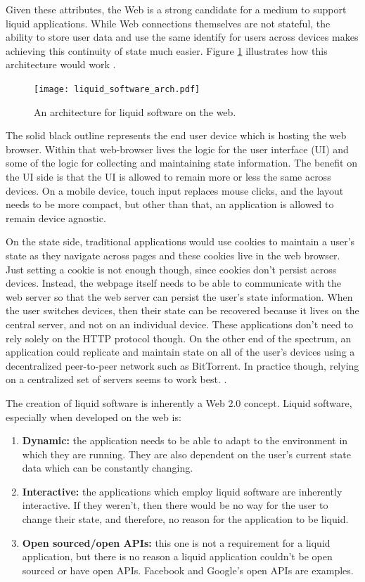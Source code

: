 \documentclass[12pt]{article}
\begin{document}
Given these attributes, the Web is a strong candidate for a medium to support liquid applications.  While Web connections themselves are not stateful, the ability to store user data and use the same identify for users across devices makes achieving this continuity of state much easier.  Figure \ref{fig:liquid_web_arch} illustrates how this architecture would work \cite{liquid_web}.

\begin{figure}[H]
  \begin{center}
    \texttt{[image: liquid\_software\_arch.pdf]}
    \caption{An architecture for liquid software on the web.}
    \label{fig:liquid_web_arch}
  \end{center}
\end{figure}

The solid black outline represents the end user device which is hosting the web browser.  Within that web-browser lives the logic for the user interface (UI) and some of the logic for collecting and maintaining state information.  The benefit on the UI side is that the UI is allowed to remain more or less the same across devices.  On a mobile device, touch input replaces mouse clicks, and the layout needs to be more compact, but other than that, an application is allowed to remain device agnostic.

On the state side, traditional applications would use cookies to maintain a user's state as they navigate across pages and these cookies live in the web browser.  Just setting a cookie is not enough though, since cookies don't persist across devices.  Instead, the webpage itself needs to be able to communicate with the web server so that the web server can persist the user's state information.  When the user switches devices, then their state can be recovered because it lives on the central server, and not on an individual device.  These applications don't need to rely solely on the HTTP protocol though.  On the other end of the spectrum, an application could replicate and maintain state on all of the user's devices using a decentralized peer-to-peer network such as BitTorrent.  In practice though, relying on a centralized set of servers seems to work best.
 \cite{liquid_web}.

The creation of liquid software is inherently a Web 2.0 concept.  Liquid software, especially when developed on the web is:
\begin{enumerate}
  \item {\textbf{Dynamic: }the application needs to be able to adapt to the environment in which they are running.  They are also dependent on the user's current state data which can be constantly changing.}
  \item {\textbf{Interactive: }the applications which employ liquid software are inherently interactive.  If they weren't, then there would be no way for the user to change their state, and therefore, no reason for the application to be liquid.}
  \item {\textbf{Open sourced/open APIs: }this one is not a requirement for a liquid application, but there is no reason a liquid application couldn't be open sourced or have open APIs.  Facebook and Google's open APIs are examples.}
\end{enumerate}
\end{document}
